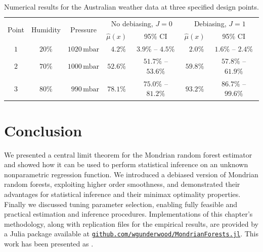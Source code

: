 \vspace{4mm}
\begin{table}[ht]
  \centering
  \begin{tabular}{|c|c|c|c|c|c|c|}
    \hline
    \multirow{2}{*}{Point}
    & \multirow{2}{*}{Humidity}
    & \multirow{2}{*}{Pressure}
    & \multicolumn{2}{|c|}{No debiasing, $J=0$}
    & \multicolumn{2}{|c|}{Debiasing, $J=1$} \\
    \cline{4-7}
    & &
    & $\hat\mu(x)$ & 95\% CI
    & $\hat\mu(x)$ & 95\% CI \\
    \hline
    $1$ & $20\%$ & $1020\,\textrm{mbar}$ &
    $\phantom{0}4.2\%$ &
    $3.9\%$ -- $4.5\%$ &
    $\phantom{0}2.0\%$ &
    $1.6\%$ -- $2.4\%$ \\
    $2$ & $70\%$ & $1000\,\textrm{mbar}$ &
    $52.6\%$ &
    $51.7\%$ -- $53.6\%$ &
    $59.8\%$ &
    $57.8\%$ -- $61.9\%$ \\
    $3$ & $80\%$ & $\phantom{1}990\,\textrm{mbar}$ &
    $78.1\%$ &
    $75.0\%$ -- $81.2\%$ &
    $93.2\%$ &
    $86.7\%$ -- $99.6\%$ \\
    \hline
  \end{tabular}
  \caption[Numerical results for the Australian weather data]{
    Numerical results for the Australian weather data
  at three specified design points.}
  \label{tab:weather_ci}
\end{table}

\section{Conclusion}%
\label{sec:mondrian_conclusion}

We presented a central limit theorem for the Mondrian random forest estimator
and showed how it can be used to perform statistical inference on an unknown
nonparametric regression function. We introduced a debiased version of Mondrian
random forests, exploiting higher order smoothness, and demonstrated their
advantages for statistical inference and their minimax optimality properties.
Finally we discussed tuning parameter selection, enabling fully feasible and
practical estimation and inference procedures. Implementations of this
chapter's methodology, along with replication files for the empirical results,
are provided by a Julia package available at
\href{https://github.com/WGUNDERWOOD/MondrianForests.jl}%
{\texttt{github.com/wgunderwood/MondrianForests.jl}}.
This work has been presented as
\cite{%
  underwood2024talkmichigan,%
  underwood2024talkillinois,%
  underwood2024talkpitt%
}.
